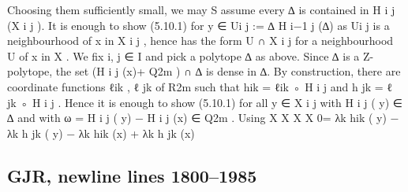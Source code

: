 \documentclass[
  10pt,
]{article}
\newenvironment{Shaded}{}{}
\newcommand{\NormalTok}[1]{#1}
\begin{document}
\begin{Shaded}
\begin{Highlighting}[]
\NormalTok{Choosing them sufficiently small, we may       S assume every ∆ is contained in H i j (X i j ). It is}
\NormalTok{enough to show (5.10.1) for y ∈ Ui j := ∆ H i−1         j}
\NormalTok{                                                          (∆) as Ui j is a neighbourhood of x in X i j ,}
\NormalTok{hence has the form U ∩ X i j for a neighbourhood U of x in X .}
\NormalTok{  We fix i, j ∈ I and pick a polytope ∆ as above. Since ∆ is a Z{-}polytope, the set (H i j (x)+}
\NormalTok{Q2m ) ∩ ∆ is dense in ∆. By construction, there are coordinate functions ℓik , ℓ jk of R2m}
\NormalTok{such that hik = ℓik ◦ H i j and h jk = ℓ jk ◦ H i j . Hence it is enough to show (5.10.1) for all}
\NormalTok{y ∈ X i j with H i j ( y) ∈ ∆ and with ω = H i j ( y) − H i j (x) ∈ Q2m . Using}
\NormalTok{                        X                X                X                X}
\NormalTok{                0=         λk hik ( y) −   λk h jk ( y) −     λk hik (x) +     λk h jk (x)}
\end{Highlighting}
\end{Shaded}

\subsection{GJR, newline lines
1800--1985}\label{gjr-newline-lines-18001985}
\end{document}
